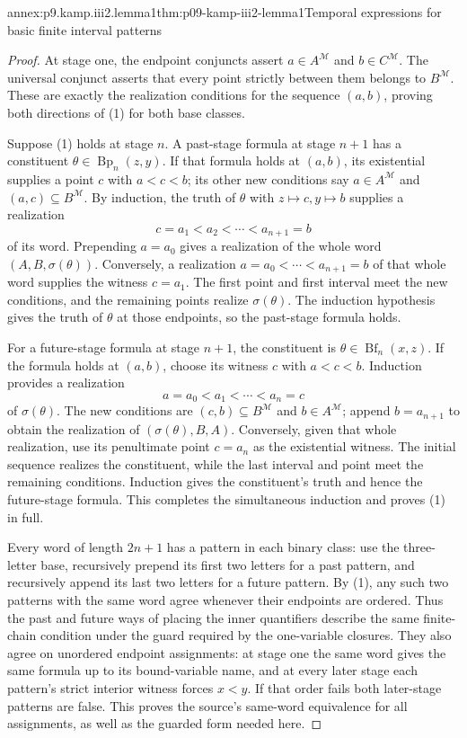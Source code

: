 \begin{annexitem}{annex:p9.kamp.iii2.lemma1}{thm:p09-kamp-iii2-lemma1}{Temporal expressions for basic finite interval patterns}
\begin{proof}
At stage one, the endpoint conjuncts assert \(a\in A^{\mathcal M}\)
and \(b\in C^{\mathcal M}\).  The universal conjunct asserts that every
point strictly between them belongs to \(B^{\mathcal M}\).  These are
exactly the realization conditions for the sequence \((a,b)\), proving
both directions of (1) for both base classes.

Suppose (1) holds at stage \(n\).  A past-stage formula at stage
\(n+1\) has a constituent \(\theta\in\operatorname{Bp}_n(z,y)\).
If that formula holds at \((a,b)\), its existential supplies a point
\(c\) with \(a<c<b\); its other new conditions say
\(a\in A^{\mathcal M}\) and \((a,c)\subseteq B^{\mathcal M}\).
By induction, the truth of \(\theta\) with \(z\mapsto c,y\mapsto b\)
supplies a realization
\[
 c=a_1<a_2<\cdots<a_{n+1}=b
\]
of its word.  Prepending \(a=a_0\) gives a realization of the whole
word \((A,B,\sigma(\theta))\).  Conversely, a realization
\(a=a_0<\cdots<a_{n+1}=b\) of that whole word supplies the witness
\(c=a_1\).  The first point and first interval meet the new conditions,
and the remaining points realize \(\sigma(\theta)\).  The induction
hypothesis gives the truth of \(\theta\) at those endpoints, so the
past-stage formula holds.

For a future-stage formula at stage \(n+1\), the constituent is
\(\theta\in\operatorname{Bf}_n(x,z)\).  If the formula holds at
\((a,b)\), choose its witness \(c\) with \(a<c<b\).  Induction
provides a realization
\[
 a=a_0<a_1<\cdots<a_n=c
\]
of \(\sigma(\theta)\).  The new conditions are
\((c,b)\subseteq B^{\mathcal M}\) and \(b\in A^{\mathcal M}\);
append \(b=a_{n+1}\) to obtain the realization of
\((\sigma(\theta),B,A)\).  Conversely, given that whole realization,
use its penultimate point \(c=a_n\) as the existential witness.  The
initial sequence realizes the constituent, while the last interval and
point meet the remaining conditions.  Induction gives the constituent's
truth and hence the future-stage formula.  This completes the simultaneous
induction and proves (1) in full.

Every word of length \(2n+1\) has a pattern in each binary class: use
the three-letter base, recursively prepend its first two letters for a
past pattern, and recursively append its last two letters for a future
pattern.  By (1), any such two patterns with the same word agree whenever
their endpoints are ordered.  Thus the past and future ways of placing
the inner quantifiers describe the same finite-chain condition under the
guard required by the one-variable closures.
They also agree on unordered endpoint assignments: at stage one the same
word gives the same formula up to its bound-variable name, and at every
later stage each pattern's strict interior witness forces \(x<y\).
If that order fails both later-stage patterns are false.  This proves the
source's same-word equivalence for all assignments, as well as the guarded
form needed here.


\end{proof}
\end{annexitem}
